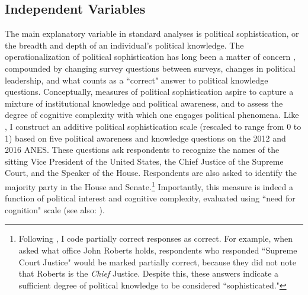 \documentclass[12pt]{paper}
\begin{document}
\subsection{Independent Variables}
The main explanatory variable in standard analyses is political sophistication, or the breadth and depth of an individual's political knowledge. The operationalization of political sophistication has long been a matter of concern \citep{luskin_measuring_1987}, compounded by changing survey questions between surveys, changes in political leadership, and what counts as a ``correct" answer to political knowledge questions. Conceptually, measures of political sophistication aspire to capture a mixture of institutional knowledge and political awareness, and to assess the degree of cognitive complexity with which one engages political phenomena. Like \cite{gomez_rethinking_2006}, I construct an additive political sophistication scale (rescaled to range from 0 to 1) based on five political awareness and knowledge questions on the 2012 and 2016 ANES. These questions ask respondents to recognize the names of the sitting Vice President of the United States, the Chief Justice of the Supreme Court, and the Speaker of the House. Respondents are also asked to identify the majority party in the House and Senate.\footnote{Following \cite{gomez_rethinking_2006}, I code partially correct responses as correct. For example, when asked what office John Roberts holds, respondents who responded ``Supreme Court Justice" would be marked partially correct, because they did not note that Roberts is the \textit{Chief} Justice. Despite this, these answers indicate a sufficient degree of political knowledge to be considered ``sophisticated."} Importantly, this measure is indeed a function of political interest and cognitive complexity, evaluated using \cite{cacioppo_dispositional_1996} ``need for cognition" scale (see also: \cite{gomez_cognitive_2006}).
\end{document}
